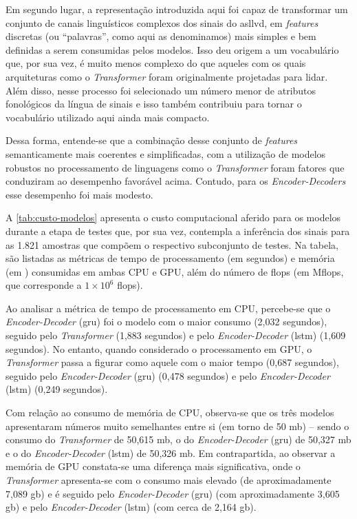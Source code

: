 Em segundo lugar, a representação introduzida aqui foi capaz de transformar um conjunto de canais linguísticos complexos dos sinais do \acrshort{asllvd}, em \textit{features} discretas (ou ``palavras'', como aqui as denominamos) mais simples e bem definidas a serem consumidas pelos modelos.
Isso deu origem a um vocabulário que, por sua vez, é muito menos complexo do que aqueles com os quais arquiteturas como o \textit{Transformer} foram originalmente projetadas para lidar. Além disso, nesse processo foi selecionado um número menor de atributos fonológicos da língua de sinais e isso também contribuiu para tornar o vocabulário utilizado aqui ainda mais compacto.

Dessa forma, entende-se que a combinação desse conjunto de \textit{features} semanticamente mais coerentes e simplificadas, com a utilização de modelos robustos no processamento de linguagens como o \textit{Transformer} foram fatores que conduziram ao desempenho favorável acima.
Contudo, para os \textit{Encoder-Decoders} esse desempenho foi mais modesto.


A \autoref{tab:custo-modelos} apresenta o custo computacional aferido para os modelos durante a etapa de testes que, por sua vez, contempla a inferência dos sinais para as 1.821 amostras que compõem o respectivo subconjunto de testes.
Na tabela, são listadas as métricas de tempo de processamento (em segundos) e memória (em ) consumidas em ambas CPU e GPU, além do número de \acrfull{flops} (em M\acrshort{flops}, que corresponde a \(1\times 10^6\) \acrshort{flops}).




Ao analisar a métrica de tempo de processamento em CPU, percebe-se que o \textit{Encoder-Decoder} (\acrshort{gru}) foi o modelo com o maior consumo (2,032 segundos), seguido pelo \textit{Transformer} (1,883 segundos) e pelo \textit{Encoder-Decoder} (\acrshort{lstm}) (1,609 segundos).
No entanto, quando considerado o processamento em GPU, o \textit{Transformer} passa a figurar como aquele com o maior tempo (0,687 segundos), seguido pelo \textit{Encoder-Decoder} (\acrshort{gru}) (0,478 segundos) e pelo \textit{Encoder-Decoder} (\acrshort{lstm}) (0,249 segundos).

Com relação ao consumo de memória de CPU, observa-se que os três modelos apresentaram números muito semelhantes entre si (em torno de 50 \acrshort{mb}) -- sendo o consumo do \textit{Transformer} de 50,615 \acrshort{mb}, o do \textit{Encoder-Decoder} (\acrshort{gru}) de 50,327 \acrshort{mb} e o do \textit{Encoder-Decoder} (\acrshort{lstm}) de 50,326 \acrshort{mb}.
Em contrapartida, ao observar a memória de GPU constata-se uma diferença mais significativa, onde o \textit{Transformer} apresenta-se com o consumo mais elevado (de aproximadamente 7,089 \acrshort{gb}) e é seguido pelo \textit{Encoder-Decoder} (\acrshort{gru}) (com aproximadamente 3,605 \acrshort{gb}) e pelo \textit{Encoder-Decoder} (\acrshort{lstm}) (com cerca de 2,164 \acrshort{gb}).

